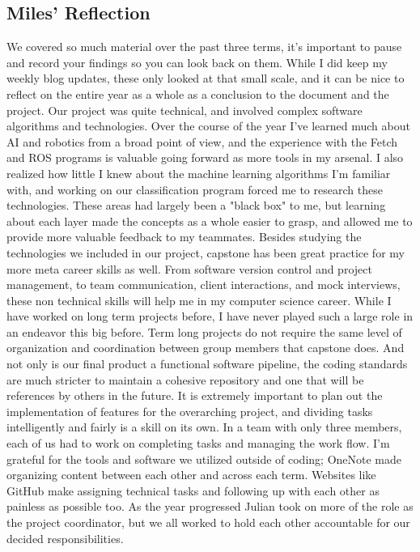 \documentclass[draftclsnofoot, onecolumn, 10pt, compsoc]{IEEEtran}
\begin{document}
  \subsection{Miles' Reflection}
  We covered so much material over the past three terms, it's important to pause and record your findings so you can look back on them. While I did keep my weekly blog updates, these only looked at that small scale, and it can be nice to reflect on the entire year as a whole as a conclusion to the document and the project. 
  Our project was quite technical, and involved complex software algorithms and technologies. Over the course of the year I've learned much about AI and robotics from a broad point of view, and the experience with the Fetch and ROS programs is valuable going forward as more tools in my arsenal. I also realized how little I knew about the machine learning algorithms I'm familiar with, and working on our classification program forced me to research these technologies. These areas had largely been a "black box" to me, but learning about each layer made the concepts as a whole easier to grasp, and allowed me to provide more valuable feedback to my teammates.   
    Besides studying the technologies we included in our project, capstone has been great practice for my more meta career skills as well. From software version control and project management, to team communication, client interactions, and mock interviews, these non technical skills will help me in my computer science career. 
    While I have worked on long term projects before, I have never played such a large role in an endeavor this big before. Term long projects do not require the same level of organization and coordination between group members that capstone does. And not only is our final product a functional software pipeline, the coding standards are much stricter to maintain a cohesive repository and one that will be references by others in the future. It is extremely important to plan out the implementation of features for the overarching project, and dividing tasks intelligently and fairly is a skill on its own. 
   In a team with only three members, each of us had to work on completing tasks and managing the work flow. I'm grateful for the tools and software we utilized outside of coding; OneNote made organizing content between each other and across each term. Websites like GitHub make assigning technical tasks and following up with each other as painless as possible too. As the year progressed Julian took on more of the role as the project coordinator, but we all worked to hold each other accountable for our decided responsibilities. 
\end{document}
